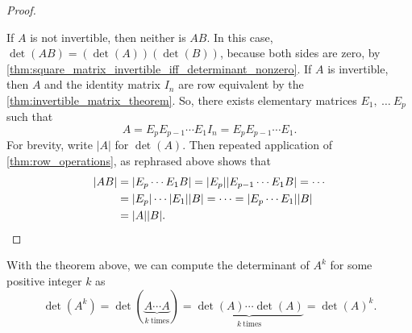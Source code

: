 \begin{proof}
  \label{prf:multiplicative_property}

  If $A$ is not invertible, then neither is $AB$. In this case, $\det(AB) =
  (\det(A))(\det(B))$, because both sides are zero, by
  \cref{thm:square_matrix_invertible_iff_determinant_nonzero}. If $A$ is
  invertible, then $A$ and the identity matrix $I_n$ are row equivalent by the
  \cref{thm:invertible_matrix_theorem}. So, there exists elementary matrices
  $E_1,~\dots~E_p$ such that
  \[%
    A = E_pE_{p-1} \cdots E_1I_n = E_pE_{p-1} \cdots E_1
  .\]%
  For brevity, write $\lvert A \rvert$ for $\det(A)$. Then repeated application
  of \cref{thm:row_operations}, as rephrased above shows that
  \begin{align*}
    \lvert AB \rvert &= \lvert E_p \cdots E_1B \rvert = \lvert E_p \rvert \lvert E_{p-1} \cdots E_1B \rvert = \cdots \\
                     &= \lvert E_p \rvert \cdots \lvert E_1 \rvert \lvert B \rvert = \cdots = \lvert E_p \cdots E_1 \rvert \lvert B \rvert \\
                     &= \lvert A \rvert \lvert B \rvert
  .\qedhere\end{align*}
\end{proof}

\begin{purpleframe}
  \label{prpl:determinant_of_a_product}

  With the theorem above, we can compute the determinant of $A^k$ for some
  positive integer $k$ as
  \[%
    \det(A^k) = \det(\underbrace{A \cdots A}_{k~\textrm{times}}) = \underbrace{\det(A)\cdots\det(A)}_{k~\textrm{times}} = \det(A)^k
  .\]%
\end{purpleframe}


\newpage
